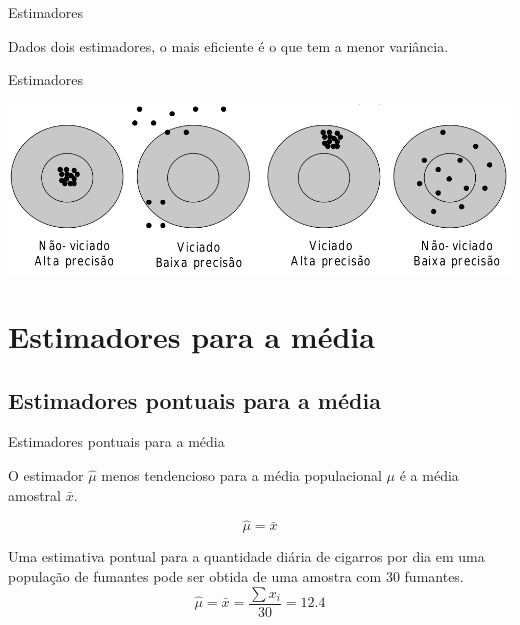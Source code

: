 \documentclass{beamer}
\begin{document}
\begin{frame}{Estimadores}
  \begin{definition}
    Dados dois estimadores, o mais \alert{eficiente} é o que tem a
    menor variância.
  \end{definition}
\end{frame}

\begin{frame}{Estimadores}
  \begin{center}
    \includegraphics[width=\textwidth]{Inf_I/estimadores}
  \end{center}
\end{frame}

\section{Estimadores para a média}

\subsection{Estimadores pontuais para a média}

\begin{frame}{Estimadores pontuais para a média}
  \begin{block}{}
    O estimador $\hat{\mu}$ menos tendencioso para a média
    populacional $\mu$ é a média amostral $\bar{x}$.
  \end{block}
  \begin{displaymath}
    \hat{\mu} = \bar{x}
  \end{displaymath}
\end{frame}

\begin{frame}
  \begin{example}
    Uma estimativa pontual para a quantidade diária de cigarros por
    dia em uma população de fumantes pode ser obtida de uma amostra
    com 30 fumantes.
    \begin{displaymath}
      \hat{\mu} = \bar{x} = \frac{\sum x_i}{30} = 12.4
    \end{displaymath}
  \end{example}
\end{frame}
\end{document}
